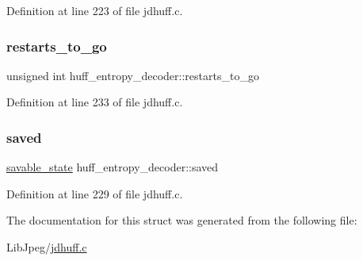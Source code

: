 Definition at line 223 of file jdhuff.\+c.

\mbox{\label{structhuff__entropy__decoder_af6005b639dada949c62767bed24daa1a}} 
\subsubsection{\texorpdfstring{restarts\_to\_go}{restarts\_to\_go}}
{\footnotesize\ttfamily unsigned int huff\+\_\+entropy\+\_\+decoder\+::restarts\+\_\+to\+\_\+go}



Definition at line 233 of file jdhuff.\+c.

\mbox{\label{structhuff__entropy__decoder_a0e0efb55a8a5b01e1e49aa9c3fb8dfe6}} 
\subsubsection{\texorpdfstring{saved}{saved}}
{\footnotesize\ttfamily \mbox{\hyperlink{structsavable__state}{savable\+\_\+state}} huff\+\_\+entropy\+\_\+decoder\+::saved}



Definition at line 229 of file jdhuff.\+c.



The documentation for this struct was generated from the following file\+:\begin{DoxyCompactItemize}
\item 
Lib\+Jpeg/\mbox{\hyperlink{jdhuff_8c}{jdhuff.\+c}}\end{DoxyCompactItemize}
